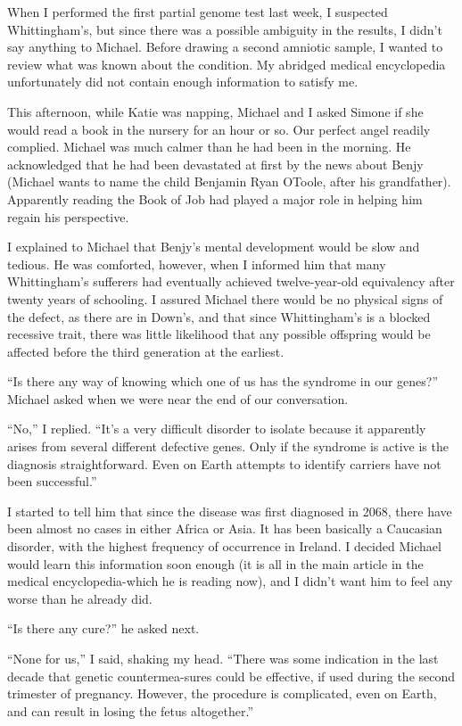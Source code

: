 \documentclass[]{article}
\begin{document}
When I performed the first partial genome test last week, I suspected Whittingham’s, but since there was a possible ambiguity in the results, I didn’t say anything to Michael.  Before drawing a second amniotic sample, I wanted to review what was known about the condition.  My abridged medical encyclopedia unfortunately did not contain enough information to satisfy me.

This afternoon, while Katie was napping, Michael and I asked Simone if she would read a book in the nursery for an hour or so.  Our perfect angel readily complied.  Michael was much calmer than he had been in the morning.  He acknowledged that he had been devastated at first by the news about Benjy (Michael wants to name the child Benjamin Ryan OToole, after his grandfather).  Apparently reading the Book of Job had played a major role in helping him regain his perspective.

I explained to Michael that Benjy’s mental development would be slow and tedious.  He was comforted, however, when I informed him that many Whittingham’s sufferers had eventually achieved twelve-year-old equivalency after twenty years of schooling.  I assured Michael there would be no physical signs of the defect, as there are in Down’s, and that since Whittingham’s is a blocked recessive trait, there was little likelihood that any possible offspring would be affected before the third generation at the earliest.

“Is there any way of knowing which one of us has the syndrome in our genes?” Michael asked when we were near the end of our conversation.

“No,” I replied.  “It’s a very difficult disorder to isolate because it apparently arises from several different defective genes.  Only if the syndrome is active is the diagnosis straightforward.  Even on Earth attempts to identify carriers have not been successful.”

I started to tell him that since the disease was first diagnosed in 2068, there have been almost no cases in either Africa or Asia.  It has been basically a Caucasian disorder, with the highest frequency of occurrence in Ireland.  I decided Michael would learn this information soon enough (it is all in the main article in the medical encyclopedia-which he is reading now), and I didn’t want him to feel any worse than he already did.

“Is there any cure?” he asked next.

“None for us,” I said, shaking my head.  “There was some indication in the last decade that genetic countermea-sures could be effective, if used during the second trimester of pregnancy.  However, the procedure is complicated, even on Earth, and can result in losing the fetus altogether.”
\end{document}
